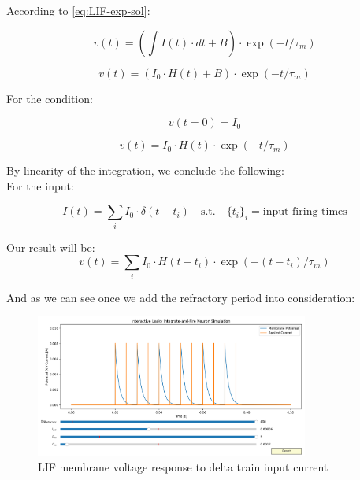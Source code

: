 According to \ref{eq:LIF-exp-sol}:

\begin{equation}
	v(t) = (\int I(t) \cdot dt + B) \cdot \exp(-t/\tau_m)
\end{equation}

\begin{equation}
	v(t) = (I_0 \cdot H(t) + B) \cdot \exp(-t/\tau_m)
\end{equation}

For the condition: 

\begin{equation}
	v(t=0) = I_0
\end{equation}

\begin{equation}
	v(t) = I_0 \cdot H(t) \cdot \exp(-t/\tau_m)
\end{equation}

By linearity of the integration, we conclude the following: \\
For the input:

\begin{equation}
	I(t) = \sum_i I_0 \cdot \delta(t-t_i) \quad \text{s.t.} \quad \{t_i\}_i = \text{input firing times}
\end{equation}

Our result will be:
\begin{equation}
	v(t) = \sum_i I_0 \cdot H(t-t_i) \cdot \exp(-(t-t_i)/\tau_m) \label{eq:LIF-spike-sol}
\end{equation}

And as we can see once we add the refractory period into consideration:

\begin{figure}[H]
    \centering
    \includegraphics[width=0.8\textwidth]{scientific-background/computational-models/LIF/graphs/LIF-spike-response-ref.png}
    \caption{LIF membrane voltage response to delta train input current}
    \label{fig:LIF-spike-ref}
\end{figure}

